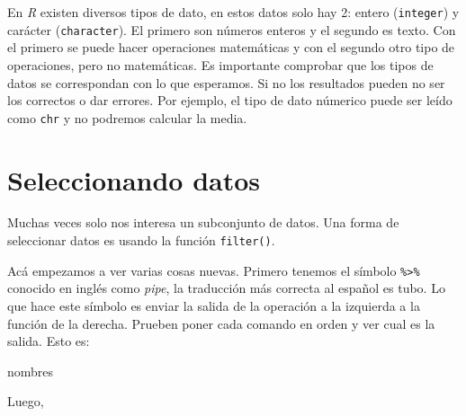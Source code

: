 \documentclass[]{book}
\newenvironment{Shaded}{\begin{snugshade}}{\end{snugshade}}
\newcommand{\DecValTok}[1]{\textcolor[rgb]{0.00,0.00,0.81}{#1}}
\newcommand{\KeywordTok}[1]{\textcolor[rgb]{0.13,0.29,0.53}{\textbf{#1}}}
\newcommand{\NormalTok}[1]{#1}
\newcommand{\OperatorTok}[1]{\textcolor[rgb]{0.81,0.36,0.00}{\textbf{#1}}}
\newcommand{\StringTok}[1]{\textcolor[rgb]{0.31,0.60,0.02}{#1}}
\theoremstyle{definition}
\theoremstyle{definition}
\theoremstyle{definition}
\theoremstyle{remark}
\begin{document}
En \emph{R} existen diversos tipos de dato, en estos datos solo hay 2:
entero (\texttt{integer}) y carácter (\texttt{character}). El primero
son números enteros y el segundo es texto. Con el primero se puede hacer
operaciones matemáticas y con el segundo otro tipo de operaciones, pero
no matemáticas. Es importante comprobar que los tipos de datos se
correspondan con lo que esperamos. Si no los resultados pueden no ser
los correctos o dar errores. Por ejemplo, el tipo de dato númerico puede
ser leído como \texttt{chr} y no podremos calcular la media.

\hypertarget{seleccionando-datos}{%
\section{Seleccionando datos}\label{seleccionando-datos}}

Muchas veces solo nos interesa un subconjunto de datos. Una forma de
seleccionar datos es usando la función \texttt{filter()}.

\begin{Shaded}
\end{Shaded}

Acá empezamos a ver varias cosas nuevas. Primero tenemos el símbolo
\texttt{\%\textgreater{}\%} conocido en inglés como \emph{pipe}, la
traducción más correcta al español es tubo. Lo que hace este símbolo es
enviar la salida de la operación a la izquierda a la función de la
derecha. Prueben poner cada comando en orden y ver cual es la salida.
Esto es:

\begin{Shaded}
\begin{Highlighting}[]
\NormalTok{nombres}
\end{Highlighting}
\end{Shaded}

Luego,

\begin{Shaded}
\end{Shaded}
\end{document}
